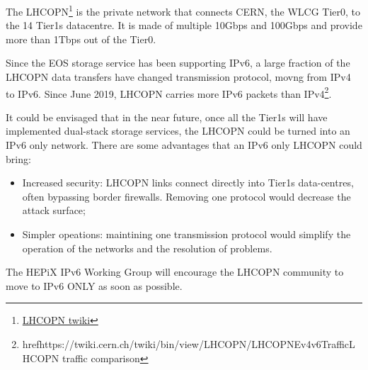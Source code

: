 
The LHCOPN\footnote{\href{https://twiki.cern.ch/twiki/bin/view/LHCOPN/WebHome}{LHCOPN twiki}} is the private network that connects CERN, the WLCG Tier0, to the 14 Tier1s datacentre. It is made of multiple 10Gbps and 100Gbps and provide more than 1Tbps out of the Tier0.

Since the EOS storage service has been supporting IPv6, a large fraction of the LHCOPN data transfers have changed transmission protocol, movng from IPv4 to IPv6. Since June 2019, LHCOPN carries more IPv6 packets than IPv4\footnote{href{https://twiki.cern.ch/twiki/bin/view/LHCOPN/LHCOPNEv4v6Traffic}{LHCOPN traffic comparison}}. 

It could be envisaged that in the near future, once all the Tier1s will have implemented dual-stack storage services, the LHCOPN could be turned into an IPv6 only network. There are some advantages that an IPv6 only LHCOPN could bring:
\begin{itemize}
  \item Increased security: LHCOPN links connect directly into Tier1s data-centres, often bypassing border firewalls. Removing one protocol would decrease the attack surface;
  \item Simpler opeations: maintining one transmission protocol would simplify the operation of the networks and the resolution of problems.
\end{itemize}

The HEPiX IPv6 Working Group will encourage the LHCOPN community to move to IPv6 ONLY as soon as possible.





